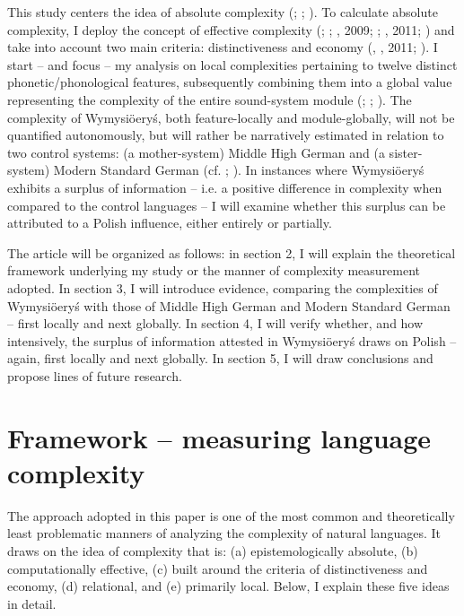 \documentclass[output=paper]{langscibook}
\begin{document}
This study centers the idea of absolute complexity (\citealt{Kusters2008}; \citealt{Dahl2004,20092004}; \citealt{Miestamo2008,20092008}). To calculate absolute complexity, I deploy the concept of effective complexity (\citealt{Gell-Mann1995}; \citealt{Gell-MannLloyd2004}; \citealt{McWhorter2005,20072005}, 2009; \citealt{Miestamo2008,20092008}; \citealt{Sinnemäki2008,20092008}, 2011; \citealt{Parkvall2008}) and take into account two main criteria: distinctiveness and economy (\citealt{Miestamo2006a,20082006a}, \citealt{Sinnemäki2008,20092008}, 2011; \citealt{Parkvall2008}). I start – and focus – my analysis on local complexities pertaining to twelve distinct phonetic/phonological features, subsequently combining them into a global value representing the complexity of the entire sound-system module (\citealt{Miestamo2006b,20092006b}; \citealt{Deutscher2009}; \citealt{Sinnemäki2014}). The complexity of Wymysiöeryś, both feature-locally and module-globally, will not be quantified autonomously, but will rather be narratively estimated in relation to two control systems: (a mother-system) Middle High German and (a sister-system) Modern Standard German (cf. \citealt{Deutscher2009}; \citealt{Dahl2009}). In instances where Wymysiöeryś exhibits a surplus of information – i.e. a positive difference in complexity when compared to the control languages – I will examine whether this surplus can be attributed to a Polish influence, either entirely or partially.

The article will be organized as follows: in section 2, I will explain the theoretical framework underlying my study or the manner of complexity measurement adopted. In section 3, I will introduce evidence, comparing the complexities of Wymysiöeryś with those of Middle High German and Modern Standard German – first locally and next globally. In section 4, I will verify whether, and how intensively, the surplus of information attested in Wymysiöeryś draws on Polish – again, first locally and next globally. In section 5, I will draw conclusions and propose lines of future research.

\section{Framework – measuring language complexity}\label{sec:wymsorys:2}

The approach adopted in this paper is one of the most common and theoretically least problematic manners of analyzing the complexity of natural languages. It draws on the idea of complexity that is:
(a) epistemologically absolute,
(b) computationally effective,
(c) built around the criteria of distinctiveness and economy,
(d) relational, and
(e) primarily local.
Below, I explain these five ideas in detail.
\end{document}
